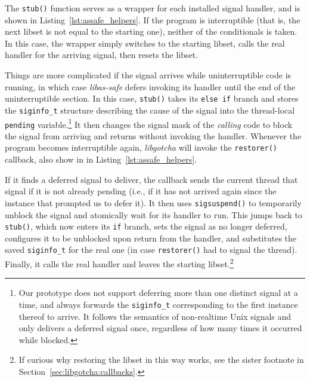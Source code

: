 The \texttt{stub()} function serves as a wrapper for each installed signal handler,
and is shown in Listing~\ref{lst:assafe_helpers}.  If the program is interruptible
(that is, the next libset is not equal to the starting one), neither of the
conditionals is taken.  In this case, the wrapper simply switches to the starting
libset, calls the real handler for the arriving signal, then resets the libset.

Things are more complicated if the signal arrives while uninterruptible code is
running, in which case \textit{libas-safe} defers invoking its handler until the end
of the uninterruptible section.  In this case, \texttt{stub()} takes its
\texttt{else if} branch and stores the \texttt{siginfo\_t} structure describing the
cause of the signal into the thread-local \texttt{pending} variable.\footnote{Our
prototype does not support deferring more than one distinct signal at a time, and
always forwards the \texttt{siginfo\_t} corresponding to the first instance thereof
to arrive.  It follows the semantics of non-realtime Unix signals and only delivers
a deferred signal once, regardless of how many times it occurred while blocked.}  It
then changes the signal mask of the \textit{calling} code to block the signal from
arriving and returns without invoking the handler.  Whenever the program becomes
interruptible again, \textit{libgotcha} will invoke the \texttt{restorer()} callback,
also show in in Listing~\ref{lst:assafe_helpers}.

If it finds a deferred signal to deliver, the callback sends the current thread that
signal if it is not already pending (i.e., if it has not arrived again since the
instance that prompted us to defer it).  It then uses \texttt{sigsuspend()} to
temporarily unblock the signal and atomically wait for its handler to run.  This
jumps back to \texttt{stub()}, which now enters its \texttt{if} branch, sets the
signal as no longer deferred, configures it to be unblocked upon return from the
handler, and substitutes the saved \texttt{siginfo\_t} for the real one (in case
\texttt{restorer()} had to signal the thread).  Finally, it calls the real
handler and leaves the starting libset.\footnote{If curious why restoring the libset
in this way works, see the sister footnote in Section~\ref{sec:libgotcha:callbacks}.}


